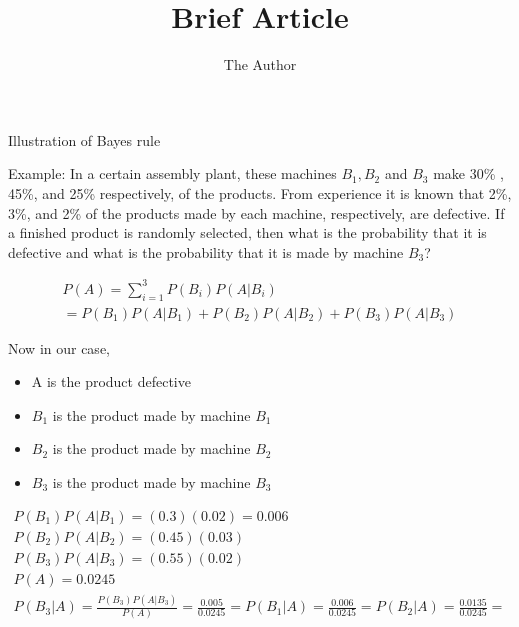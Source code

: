 \documentclass[11pt]{article}
\title{Brief Article}
\author{The Author}
\begin{document}
\maketitle


Illustration of Bayes rule

Example: In a certain assembly plant, these machines $B_1, B_2$ and $B_3$ make 30\% , 45\%, and 25\% respectively, of the products.  From experience it is known that 2\%, 3\%, and 2\% of the products made by each machine, respectively, are defective.  If a finished product is randomly selected, then what is the probability that it is defective and what is the probability that it is made by machine $B_3$?

\begin{eqnarray}
P(A) = \sum_{i=1}^{3} P(B_i )P(A| B_i) \\
= P(B_1)P(A|B_1) + P(B_2)P(A|B_2) + P(B_3)P(A|B_3)
\end{eqnarray}

Now in our case, 
\begin{itemize}
	\item A is the product defective
	\item $B_1$ is the product made by machine $B_1$
	\item $B_2$ is the product made by machine $B_2$
	\item $B_3$ is the product made by machine $B_3$
\end{itemize}


\begin{eqnarray}
	P(B_1)P(A|B_1) = (0.3)(0.02) = 0.006\\
	P(B_2)P(A|B_2) =(0.45)(0.03) \\
	P(B_3)P(A|B_3) =(0.55)(0.02) \\
	P(A) = 0.0245 \\
	P(B_3 | A) = \frac{P(B_3)P(A|B_3)}{P(A)} = \frac{0.005}{0.0245} =
	P(B_1 | A) = \frac{0.006}{0.0245} =  
	P(B_2 | A) = \frac{0.0135}{0.0245} = 
\end{eqnarray}
\end{document}
